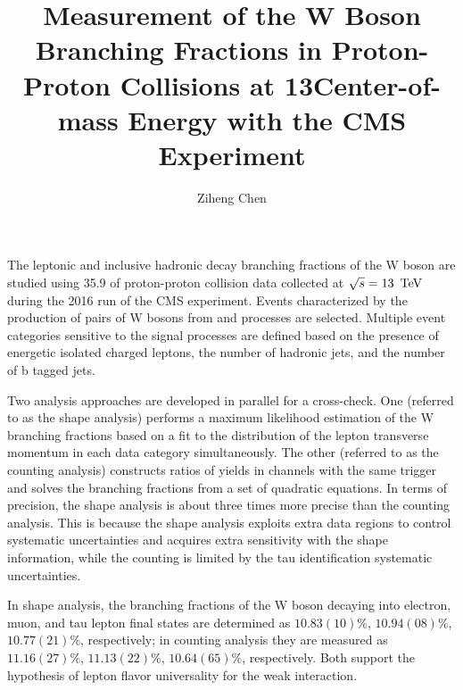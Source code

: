 \documentclass[12pt,reqno]{nuthesis}
\author{Ziheng Chen}
\title{Measurement of the W Boson Branching Fractions in Proton-Proton Collisions at 13\TeV Center-of-mass Energy with the CMS Experiment}
\begin{document}
    
    


    \frontmatter

    \maketitle

    \copyrightpage

    \abstract
    The leptonic and inclusive hadronic decay branching fractions of the W boson are studied using 35.9 \fbinv of proton-proton collision data collected at $\sqrt{s}=13~\,\text{Te\hspace{-.08em}V}$ during the 2016 run of the CMS experiment. Events characterized by the production of pairs of W bosons from \ttbar and \tW processes are selected. Multiple event categories sensitive to the signal processes are defined based on the presence of energetic isolated charged leptons, the number of hadronic jets, and the number of b tagged jets.  
    
    Two analysis approaches are developed in parallel for a cross-check. One (referred to as the shape analysis) performs a maximum likelihood estimation of the W branching fractions based on a fit to the distribution of the lepton transverse momentum in each data category simultaneously. The other (referred to as the counting analysis) constructs ratios of yields in channels with the same trigger and solves the branching fractions from a set of quadratic equations. In terms of precision, the shape analysis is about three times more precise than the counting analysis. This is because the shape analysis exploits extra data regions to control systematic uncertainties and acquires extra sensitivity with the shape information, while the counting is limited by the tau identification systematic uncertainties.
    
    
    In shape analysis, the branching fractions of the W boson decaying into electron, muon, and tau lepton final states are determined as $10.83(10)\%$, $10.94(08)\%$, $10.77(21)\%$, respectively; in counting analysis they are measured as $11.16(27)\%$, $11.13(22)\%$, $10.64(65)\%$, respectively. Both support the hypothesis of lepton flavor universality for the weak interaction.
    
\end{document}
